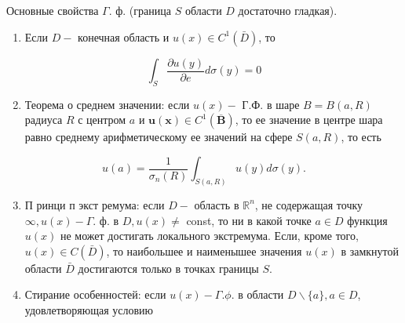 \documentclass[10pt]{article}
\begin{document}
Основные свойства $\Gamma$. ф. (граница $S$ области $D$ достаточно гладкая).



\begin{enumerate}

  \item Если $D-$ конечная область и $u(x) \in C^{1}(\bar{D})$, то

\end{enumerate}



\[

\int_{S} \frac{\partial u(y)}{\partial e} d \sigma(y)=0

\]



\begin{enumerate}

  \setcounter{enumi}{1}

  \item Теорема о среднем значении: если $u(x)-$ Г.Ф. в шаре $B=B(a, R)$ радиуса $R$ с центром $a$ и $\boldsymbol{u}(\boldsymbol{x}) \in C^{1}(\overline{\boldsymbol{B}})$, то ее значение в центре шара равно среднему арифметическому ее значений на сфере $S(a, R)$, то есть

\end{enumerate}



\[

u(a)=\frac{1}{\sigma_{n}(R)} \int_{S(a, R)} u(y) d \sigma(y) .

\]



\begin{enumerate}

  \setcounter{enumi}{2}

  \item П ринци п экст ремума: если $D-$ область в $\mathbb{R}^{n}$, не содержащая точку $\infty, u(x)-\Gamma$. ф. в $D, u(x) \neq$ const, то ни в какой точке $a \in D$ функция $u(x)$ не может достигать локального экстремума. Если, кроме того, $u(x) \in C(\bar{D})$, то наибольшее и наименышее значения $u(x)$ в замкнутой области $\bar{D}$ достигаются только в точках границы $S$.



  \item Стирание особенностей: если $u(x)-\Gamma . \phi$. в области $D \backslash\{a\}, a \in D$, удовлетворяющая условию



\end{enumerate}
\end{document}

